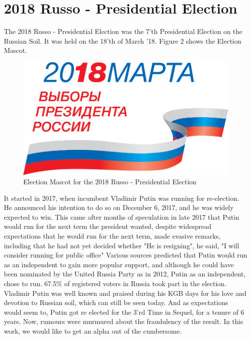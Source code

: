 \documentclass[conference]{IEEEtran}
\begin{document}
\section{2018 Russo - Presidential Election}
The 2018 Russo - Presidential Election was the 7’th Presidential Election on the Russian Soil. It was held on the 18’th of March ’18. Figure 2 shows the Election Mascot.
\begin{figure}[htbp]
\centerline{\includegraphics[width = \linewidth]{2}}
\label{fig2}
\caption{Election Mascot for the 2018 Russo - Presidential Election}
\end{figure}
It started in 2017, when incumbent Vladimir Putin was running for re-election. He announced his intention to do so on December 6, 2017, and he was widely expected to win. This came after months of speculation in late 2017 that Putin would run for the next term the president wanted, despite widespread expectations that he would run for the next term, made evasive remarks, including that he had  not  yet decided whether "He is resigning", he said, "I will consider running for public office" Various sources predicted that Putin would run as an independent to gain more popular support, and although he could  have been nominated by the United Russia Party as in 2012, Putin as an independent, chose to run. 67.5\% of registered voters in Russia took part in the election. Vladimir Putin was well known and praised during his KGB days for his love and devotion to Russian soil, which can still be seen today. And as expectations would seem to, Putin got re elected for the 3’rd Time in Sequel, for a tenure of 6 years. Now, rumours were murmured about the fraudulency of the result. In this work, we would like to get an alpha out of the cumbersome. 
\end{document}
